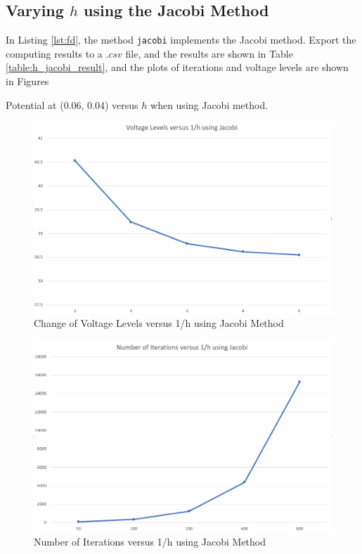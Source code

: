 \documentclass[a4paper,titlepage]{article}
\begin{document}
		\subsection{Varying $h$ using the Jacobi Method}
			In Listing \ref{lst:fd}, the method \texttt{jacobi} implements the Jacobi method. Export the computing results to a $.csv$ file, and the results are shown in Table \ref{table:h_jacobi_result}, and the plots of iterations and voltage levels are shown in Figures 
			\begin{table}[!htb]
				\centering
				\caption{Potential at (0.06, 0.04) versus $h$ when using Jacobi method.}
				\label{table:h_jacobi_result}
			\end{table}
			\begin{figure}[!h]
				\centering
				\includegraphics[width=\linewidth]{vol_1h_jacobi}
				\caption{Change of Voltage Levels versus 1/h using Jacobi Method}
				\label{vol_1h_jacobi}
			\end{figure}
			\begin{figure}[!h]
				\centering
				\includegraphics[width=\linewidth]{iter_1h_jacobi}
				\caption{Number of Iterations versus 1/h using Jacobi Method}
				\label{iter_1h_jacobi}
			\end{figure}
			
\end{document}
